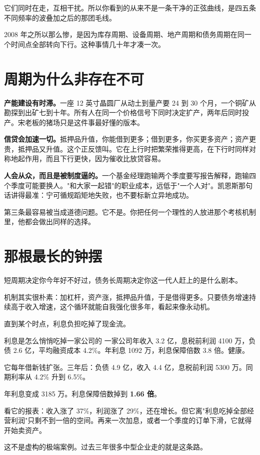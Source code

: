 它们同时在走，互相干扰。所以你看到的从来不是一条干净的正弦曲线，是四五条不同频率的波叠加之后的那团毛线。

2008 年之所以那么惨，是因为库存周期、设备周期、地产周期和债务周期在同一个时间点全部转向下行。这种事情几十年才凑一次。

\section{周期为什么非存在不可}

\textbf{产能建设有时滞。}一座 12 英寸晶圆厂从动土到量产要 24 到 30 个月，一个铜矿从勘探到出矿七到十年。所有人在同一个价格信号下同时决定扩产，两年后同时投产。宋老板的猪场只是这件事最好懂的版本。

\textbf{信贷会加速一切。}抵押品升值，你能借到更多；借到更多，你买更多资产；资产更贵，抵押品又升值。这个正反馈叫。它在上行时把繁荣推得更高，在下行时同样对称地起作用，而且下行更快，因为催收比放贷容易。

\textbf{人会从众，而且是被制度逼的。}一个基金经理跑输两个季度要写报告解释，跑输四个季度可能要换人。"和大家一起错"的职业成本，远低于"一个人对"。凯恩斯那句话讲得最准：宁可循规蹈矩地失败，也不要标新立异地成功。

第三条最容易被当成道德问题。它不是。你把任何一个理性的人放进那个考核机制里，他都会做出同样的选择。

\bookbreak

\section{那根最长的钟摆}

短周期决定你今年好不好过，债务长周期决定你这一代人赶上的是什么剧本。

机制其实很朴素：加杠杆，资产涨，抵押品升值，于是借得更多。只要债务增速持续高于收入增速，这个循环就能自我强化很多年，看起来像永动机。

直到某个时点，利息负担吃掉了现金流。

\begin{egbox}{利息是怎么悄悄吃掉一家公司的}
一家公司年收入 3.2 亿，息税前利润 4100 万，负债 2.6 亿，平均融资成本 4.2\%。年利息 1092 万，利息保障倍数 3.8 倍。健康。

它每年借新钱扩张。三年后：负债 4.9 亿，收入 4.4 亿，息税前利润 5300 万。同期利率从 4.2\% 升到 6.5\%。

年利息变成 3185 万。利息保障倍数掉到 \textbf{1.66 倍}。

看它的报表：收入涨了 37\%，利润涨了 29\%，还在增长。但它离"利息吃掉全部经营利润"只剩不到一倍的空间。再来一次加息，或者一个季度的订单下滑，它就得开始卖资产。

这不是虚构的极端案例。过去三年很多中型企业走的就是这条路。

\end{egbox}

